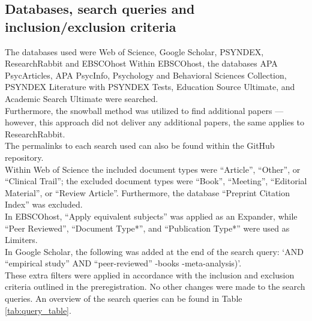 \documentclass[
  stu, a4paper,floatsintext]{apa7}
\begin{document}
\subsection{Databases, search queries and inclusion/exclusion criteria}\label{databases-search-queries-and-inclusionexclusion-criteria}

The databases used were Web of Science, Google Scholar, PSYNDEX, ResearchRabbit and EBSCOhost Within EBSCOhost, the databases APA PsycArticles, APA PsycInfo, Psychology and Behavioral Sciences Collection, PSYNDEX Literature with PSYNDEX Tests, Education Source Ultimate, and Academic Search Ultimate were searched.\\
Furthermore, the snowball method was utilized to find additional papers --- however, this approach did not deliver any additional papers, the same applies to ResearchRabbit.\\
The permalinks to each search used can also be found within the GitHub repository.\\
Within Web of Science the included document types were ``Article'', ``Other'', or ``Clinical Trail''; the excluded document types were ``Book'', ``Meeting'', ``Editorial Material'', or ``Review Article''.
Furthermore, the database ``Preprint Citation Index'' was excluded.\\
In EBSCOhost, ``Apply equivalent subjects'' was applied as an Expander, while ``Peer Reviewed'', ``Document Type*'', and ``Publication Type*'' were used as Limiters.\\
In Google Scholar, the following was added at the end of the search query: `AND ``empirical study'' AND ``peer-reviewed'' -books -meta-analysis)'.\\
These extra filters were applied in accordance with the inclusion and exclusion criteria outlined in the preregistration. No other changes were made to the search queries. An overview of the search queries can be found in Table \ref{tab:query_table}.
\end{document}
